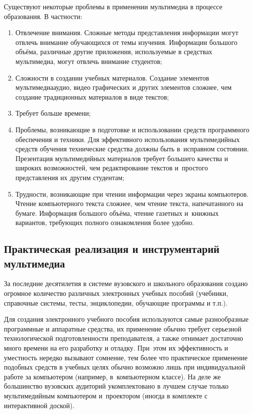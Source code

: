 \documentclass{ou}
\begin{document}
Существуют некоторые проблемы в применении мультимедиа в процессе образования. В частности:
\begin{enumerate}[leftmargin=0em, itemindent=3.75em, nosep, label=\arabic*)]
\item Отвлечение внимания. Сложные методы представления информации могут отвлечь внимание обучающихся от темы изучения. Информации большого объёма, различные другие приложения, используемые в средствах мультимедиа, могут отвлечь внимание студентов; 
\item Сложности в создании учебных материалов. Создание элементов мультимедиааудио, видео графических и других элементов сложнее, чем создание традиционных материалов в виде текстов; 
\item Требует больше времени; 
\item Проблемы, возникающие в подготовке и использовании средств программного обеспечения и техники. Для эффективного использования мультимедийных средств обучения технические средства должны быть в~исправном состоянии. Презентация мультимедийных материалов требует большего качества и широких возможностей, чем редактирование текстов и~простого представления их другим студентам; 
\item Трудности, возникающие при чтении информации через экраны компьютеров. Чтение компьютерного текста сложнее, чем чтение текста, напечатанного на бумаге. Информация большого объёма, чтение газетных и~книжных вариантов, требующих полного ознакомления более удобно.
\end{enumerate}
\subsection{Практическая реализация и инструментарий мультимедиа}
За последние десятилетия в системе вузовского и школьного образования создано огромное количество различных электронных учебных пособий (учебники, справочные системы, тесты, энциклопедии, обучающие программы и т.п.).

Для создания электронного учебного пособия используются самые разнообразные программные и аппаратные средства, их применение обычно требует серьезной технологической подготовленности преподавателя, а также отнимает достаточно много времени на его разработку и отладку. При~этом их эффективность и уместность нередко вызывают сомнение, тем более что практическое применение подобных средств в учебных целях обычно возможно лишь при индивидуальной работе за компьютером (например, в~компьютерном классе). На деле же большинство вузовских аудиторий укомплектовано в лучшем случае только мультимедийным компьютером и~проектором (иногда в комплекте с интерактивной доской).
\end{document}

